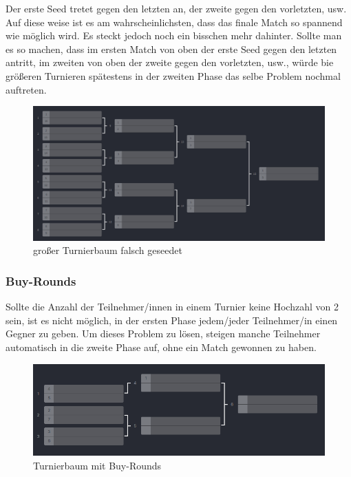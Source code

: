 Der erste Seed tretet gegen den letzten an, der zweite gegen den vorletzten, usw. Auf diese weise ist es am wahrscheinlichsten, dass das finale Match so spannend wie möglich wird. 
Es steckt jedoch noch ein bisschen mehr dahinter. Sollte man es so machen, dass im ersten Match von oben der erste Seed gegen den letzten antritt, im zweiten von oben der zweite gegen den vorletzten, usw., 
würde bie größeren Turnieren spätestens in der zweiten Phase das selbe Problem nochmal auftreten.

\begin{figure}[H]
    \includegraphics[scale=0.55]{pics/elimination_tree_seeded_wrong_big.png}
    \caption{großer Turnierbaum falsch geseedet\cite{implementation-elimination-1}}
\end{figure}



\subsubsection{Buy-Rounds}

Sollte die Anzahl der Teilnehmer/innen in einem Turnier keine Hochzahl von 2 sein, ist es nicht möglich, in der ersten Phase jedem/jeder Teilnehmer/in einen Gegner zu geben. 
Um dieses Problem zu lösen, steigen manche Teilnehmer automatisch in die zweite Phase auf, ohne ein Match gewonnen zu haben.

\begin{figure}[H]
    \includegraphics[scale=0.75]{pics/elimination_buy_rounds.png}
    \caption{Turnierbaum mit Buy-Rounds\cite{implementation-elimination-1}}
\end{figure}

